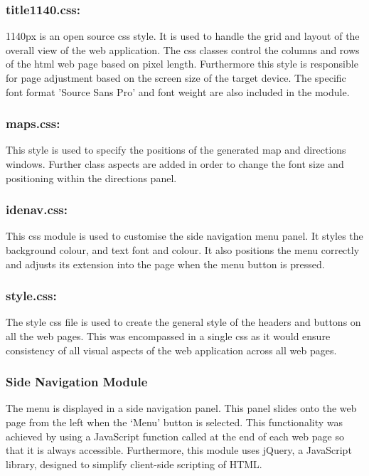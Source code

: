\documentclass[10pt,twocolumn]{witseiepaper}
\begin{document}
		\subsubsection*{title1140.css:}  1140px is an open source css style. It is used to handle the grid and layout of the overall view of the web application. The css classes control the columns and rows of the html web page based on pixel length. Furthermore this style is responsible for page adjustment based on the screen size of the target device. The specific font format 'Source Sans Pro' and font weight are also included in the module.
		
		\subsubsection*{maps.css:} This style is used to specify the positions of the generated map and directions windows. Further class aspects are added in order to change the font size and positioning within the directions panel.
		
		\subsubsection*{idenav.css:} This css module is used to customise the side navigation menu panel. It styles the background colour, and text font and colour. It also positions the menu correctly and adjusts its extension into the page when the menu button is pressed.
		
		\subsubsection*{style.css:} The style css file is used to create the general style of the headers and buttons on all the web pages. This was encompassed in a single css as it would ensure consistency of all visual aspects of the web application across all web pages.  
		
		\subsubsection{Side Navigation Module}
		
		The menu is displayed in a side navigation panel. This panel slides onto the web page from the left when the `Menu' button is selected. This functionality was achieved by using a JavaScript function called at the end of each web page so that it is always accessible. Furthermore, this module uses jQuery, a JavaScript library, designed to simplify client-side scripting of HTML.	
		
\end{document}
